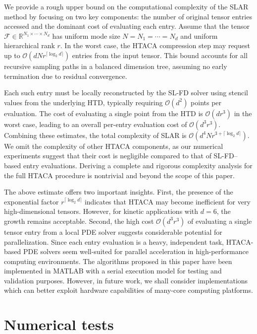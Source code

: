 \documentclass{article}
\theoremstyle{plain}
\theoremstyle{definition}
\theoremstyle{remark}
\begin{document}
We provide a rough upper bound on the computational complexity of the SLAR method by focusing on two key components: the number of original tensor entries accessed and the dominant cost of evaluating each entry. Assume that the tensor \(\mathcal{F} \in \mathbb{R}^{N_1 \times \cdots \times N_d}\) has uniform mode size \(N = N_1 = \cdots = N_d\) and uniform hierarchical rank \(r\). In the worst case, the HTACA compression step may request up to \(\mathcal{O}(d N r^{\lceil \log_2 d \rceil})\) entries from the input tensor. This bound accounts for all recursive sampling paths in a balanced dimension tree, assuming no early termination due to residual convergence.

Each such entry must be locally reconstructed by the SL-FD solver using stencil values from the underlying HTD, typically requiring $\mathcal{O}(d^2)$ points per evaluation. The cost of evaluating a single point from the HTD is \(\mathcal{O}(d r^3)\) in the worst case, leading to an overall per-entry evaluation cost of \(\mathcal{O}(d^3 r^3)\). Combining these estimates, the total complexity of SLAR is $\mathcal{O}(d^4 N r^{3 + \lceil \log_2 d \rceil}).$
We omit the complexity of other HTACA components, as our numerical experiments suggest that their cost is negligible compared to that of SL-FD–based entry evaluations. Deriving a complete and rigorous complexity analysis for the full HTACA procedure is nontrivial and beyond the scope of this paper.

The above estimate offers two important insights. First, the presence of the exponential factor \(r^{\lceil \log_2 d \rceil}\) indicates that HTACA may become inefficient for very high-dimensional tensors. However, for kinetic applications with \(d = 6\), the growth remains acceptable. Second, the high cost \(\mathcal{O}(d^3 r^3)\) of evaluating a single tensor entry from a local PDE solver suggests considerable potential for parallelization. Since each entry evaluation is a heavy, independent task, HTACA-based PDE solvers seem well-suited for parallel acceleration in high-performance computing environments. The algorithms proposed in this paper have been implemented in MATLAB with a serial execution model for testing and validation purposes. However, in future work, we shall consider implementations which can better exploit hardware capabilities of many-core computing platforms. 


\section{Numerical tests}\label{sec:numerical_tests}
\end{document}
